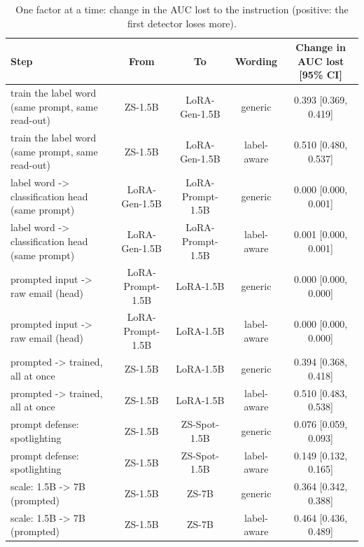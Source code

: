 \begin{table}[t]
\centering
\caption{One factor at a time: change in the AUC lost to the instruction (positive: the first detector loses more).}
\label{tab:steps}
\footnotesize
\begin{tabular}{lcccc}
\toprule
\textbf{Step} & \textbf{From} & \textbf{To} & \textbf{Wording} & \textbf{Change in AUC lost [95\% CI]} \\
\midrule
train the label word (same prompt, same read-out) & ZS-1.5B & LoRA-Gen-1.5B & generic & 0.393 [0.369, 0.419] \\
train the label word (same prompt, same read-out) & ZS-1.5B & LoRA-Gen-1.5B & label-aware & 0.510 [0.480, 0.537] \\
label word -> classification head (same prompt) & LoRA-Gen-1.5B & LoRA-Prompt-1.5B & generic & 0.000 [0.000, 0.001] \\
label word -> classification head (same prompt) & LoRA-Gen-1.5B & LoRA-Prompt-1.5B & label-aware & 0.001 [0.000, 0.001] \\
prompted input -> raw email (head) & LoRA-Prompt-1.5B & LoRA-1.5B & generic & 0.000 [0.000, 0.000] \\
prompted input -> raw email (head) & LoRA-Prompt-1.5B & LoRA-1.5B & label-aware & 0.000 [0.000, 0.000] \\
prompted -> trained, all at once & ZS-1.5B & LoRA-1.5B & generic & 0.394 [0.368, 0.418] \\
prompted -> trained, all at once & ZS-1.5B & LoRA-1.5B & label-aware & 0.510 [0.483, 0.538] \\
prompt defense: spotlighting & ZS-1.5B & ZS-Spot-1.5B & generic & 0.076 [0.059, 0.093] \\
prompt defense: spotlighting & ZS-1.5B & ZS-Spot-1.5B & label-aware & 0.149 [0.132, 0.165] \\
scale: 1.5B -> 7B (prompted) & ZS-1.5B & ZS-7B & generic & 0.364 [0.342, 0.388] \\
scale: 1.5B -> 7B (prompted) & ZS-1.5B & ZS-7B & label-aware & 0.464 [0.436, 0.489] \\
\bottomrule
\end{tabular}
\end{table}